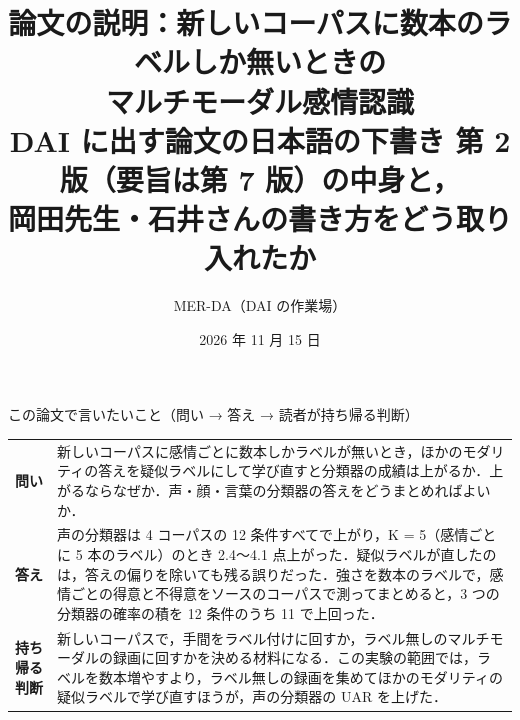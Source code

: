 \documentclass[a4paper,10pt]{ltjsarticle}
\title{論文の説明：新しいコーパスに数本のラベルしか無いときの\\マルチモーダル感情認識\\[5pt]
\large DAI に出す論文の日本語の下書き 第 2 版（要旨は第 7 版）の中身と，\\
\large 岡田先生・石井さんの書き方をどう取り入れたか}
\author{MER-DA（DAI の作業場）}
\date{2026 年 11 月 15 日}
\begin{document}
\maketitle
\thispagestyle{plain}

\begin{waku}{この論文で言いたいこと（問い → 答え → 読者が持ち帰る判断）}
\small
\begin{tabular}{@{}>{\bfseries}p{2.3cm}p{13.8cm}@{}}
問い & 新しいコーパスに感情ごとに数本しかラベルが無いとき，ほかのモダリティの答えを疑似ラベルにして学び直すと分類器の成績は上がるか．上がるならなぜか．声・顔・言葉の分類器の答えをどうまとめればよいか． \\[2pt]
答え & 声の分類器は 4 コーパスの 12 条件すべてで上がり，K = 5（感情ごとに 5 本のラベル）のとき 2.4〜4.1 点上がった．疑似ラベルが直したのは，答えの偏りを除いても残る誤りだった．強さを数本のラベルで，感情ごとの得意と不得意をソースのコーパスで測ってまとめると，3 つの分類器の確率の積を 12 条件のうち 11 で上回った． \\[2pt]
持ち帰る判断 & 新しいコーパスで，手間をラベル付けに回すか，ラベル無しのマルチモーダルの録画に回すかを決める材料になる．この実験の範囲では，ラベルを数本増やすより，ラベル無しの録画を集めてほかのモダリティの疑似ラベルで学び直すほうが，声の分類器の UAR を上げた． \\
\end{tabular}
\end{waku}
\end{document}
